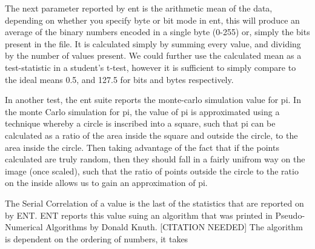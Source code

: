 \documentclass{IEEEtran}
\begin{document}
The next parameter reported by ent is the arithmetic mean of the data, depending on whether you specify byte or bit mode in ent, this will produce an average of the binary numbers encoded in a single byte (0-255) or, simply the bits present in the file. It is calculated simply by summing every value, and dividing by the number of values present. We could further use the calculated mean as a test-statistic in a student's t-test, however it is sufficient to simply compare to the ideal means 0.5, and 127.5 for bits and bytes respectively.

In another test, the ent suite reports the monte-carlo simulation value for pi. In the monte Carlo simulation for pi, the value of pi is approximated using a technique whereby a circle is inscribed into a square, such that pi can be calculated as a ratio of the area inside the square and outside the circle, to the area inside the circle. Then taking advantage of the fact that if the points calculated are truly random, then they should fall in a fairly unifrom way on the image (once scaled), such that the ratio of points outside the circle to the ratio on the inside allows us to gain an approximation of pi.

The Serial Correlation of a value is the last of the statistics that are reported on by ENT. ENT reports this value suing an algorithm that was printed in Pseudo-Numerical Algorithms by Donald Knuth. [CITATION NEEDED] The algorithm is dependent on the ordering of numbers, it takes 






\end{document}
